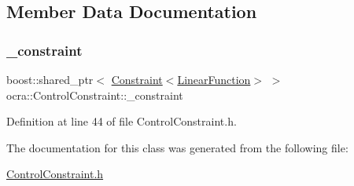 \subsection{Member Data Documentation}
\hypertarget{classocra_1_1ControlConstraint_a47cebded91be870b03e1dddc7b0c215b}{}\label{classocra_1_1ControlConstraint_a47cebded91be870b03e1dddc7b0c215b} 
\subsubsection{\texorpdfstring{\+\_\+constraint}{\_constraint}}
{\footnotesize\ttfamily boost\+::shared\+\_\+ptr$<$ \hyperlink{classocra_1_1Constraint}{Constraint}$<$\hyperlink{classocra_1_1LinearFunction}{Linear\+Function}$>$ $>$ ocra\+::\+Control\+Constraint\+::\+\_\+constraint\hspace{0.3cm}{\ttfamily [protected]}}



Definition at line 44 of file Control\+Constraint.\+h.



The documentation for this class was generated from the following file\+:\begin{DoxyCompactItemize}
\item 
\hyperlink{ControlConstraint_8h}{Control\+Constraint.\+h}\end{DoxyCompactItemize}
